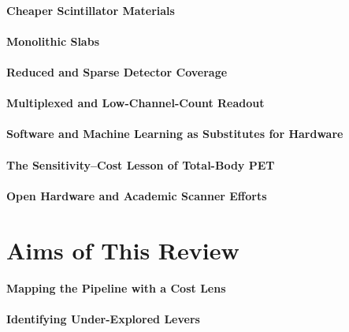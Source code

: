 \paragraph{Cheaper Scintillator Materials}

\paragraph{Monolithic Slabs}

\paragraph{Reduced and Sparse Detector Coverage}

\paragraph{Multiplexed and Low-Channel-Count Readout}

\paragraph{Software and Machine Learning as Substitutes for Hardware}

\paragraph{The Sensitivity--Cost Lesson of Total-Body PET}

\paragraph{Open Hardware and Academic Scanner Efforts}

\section{Aims of This Review}

\paragraph{Mapping the Pipeline with a Cost Lens}

\paragraph{Identifying Under-Explored Levers}

